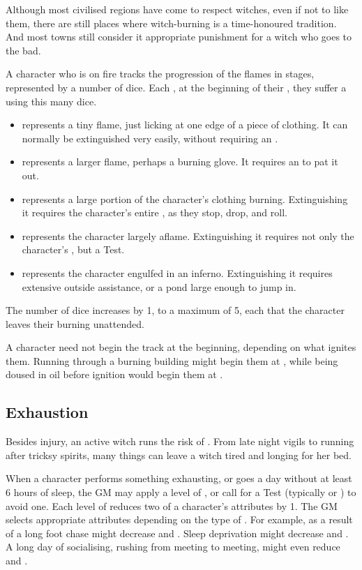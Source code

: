 Although most civilised regions have come to respect witches, even if not to like them, there are still places where witch-burning is a time-honoured tradition.
And most towns still consider it appropriate punishment for a witch who goes to the bad.

A character who is on fire tracks the progression of the flames in stages, represented by a number of dice.
Each {\round}, at the beginning of their {\turn}, they suffer a {\damagetest} using this many dice.
\begin{itemize}
	\item {} represents a tiny flame, just licking at one edge of a piece of clothing.
		It can normally be extinguished very easily, without requiring an {\action}.
	\item {} represents a larger flame, perhaps a burning glove.
		It requires an {\action} to pat it out.
	\item {} represents a large portion of the character's clothing burning.
		Extinguishing it requires the character's entire {\turn}, as they stop, drop, and roll.
	\item {} represents the character largely aflame.
		Extinguishing it requires not only the character's {\turn}, but a Test.
	\item {} represents the character engulfed in an inferno.
		Extinguishing it requires extensive outside assistance, or a pond large enough to jump in.
\end{itemize}
The number of dice increases by 1, to a maximum of 5, each {\turn} that the character leaves their burning unattended.

A character need not begin the track at the beginning, depending on what ignites them.
Running through a burning building might begin them at , while being doused in oil before ignition would begin them at .

\subsection{Exhaustion}

Besides injury, an active witch runs the risk of {\exhaustion}.
From late night vigils to running after tricksy spirits, many things can leave a witch tired and longing for her bed.

When a character performs something exhausting, or goes a day without at least 6 hours of sleep, the GM may apply a level of {\exhaustion}, or call for a Test (typically  or ) to avoid one.
Each level of {\exhaustion} reduces two of a character's attributes by 1.
The GM selects appropriate attributes depending on the type of {\exhaustion}.
For example, {\exhaustion} as a result of a long foot chase might decrease  and .
Sleep deprivation might decrease  and .
A long day of socialising, rushing from meeting to meeting, might even reduce  and .

